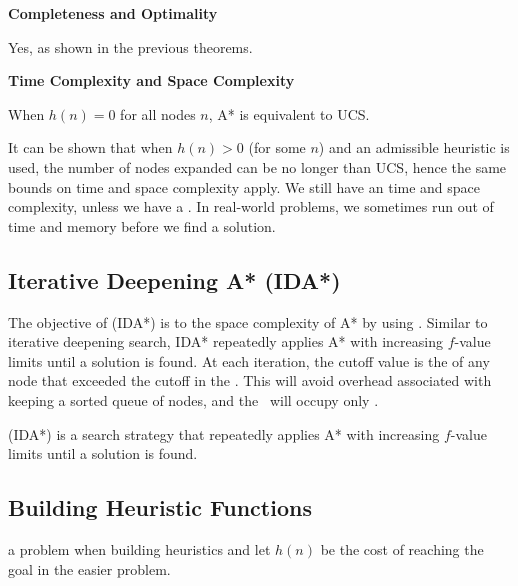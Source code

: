 \begin{listu}
    \item \textbf{Completeness and Optimality}

    Yes, as shown in the previous theorems.

    \item \textbf{Time Complexity and Space Complexity}

    When $h(n) = 0$ for all nodes $n$, A* is equivalent to UCS.

    It can be shown that when $h(n) > 0$ (for some $n$) and an admissible heuristic is used, the number of nodes expanded can be no longer than UCS, hence the same bounds on time and space complexity apply. We still have an  time and space complexity, unless we have a . In real-world problems, we sometimes run out of time and memory before we find a solution.
\end{listu}

\subsection{Iterative Deepening A* (IDA*)}

The objective of  (IDA*) is to  the  space complexity of A* by using . Similar to iterative deepening search, IDA* repeatedly applies A* with increasing $f$-value limits until a solution is found. At each iteration, the cutoff value is the  of any node that exceeded the cutoff in the . This will avoid overhead associated with keeping a sorted queue of nodes, and the \Frontier~will occupy only .

\begin{definition}\label{def:ida-star}
     (IDA*) is a search strategy that repeatedly applies A* with increasing $f$-value limits until a solution is found.
\end{definition}

\subsection{Building Heuristic Functions}

\begin{remark}
     a problem when building heuristics and let $h(n)$ be the cost of reaching the goal in the easier problem.
\end{remark}

